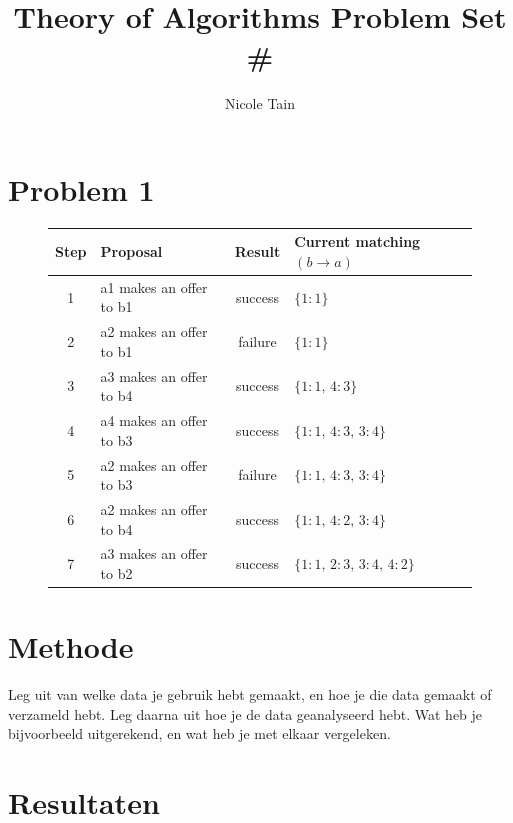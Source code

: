\documentclass[12pt]{article}
\title{Theory of Algorithms Problem Set \#}
\author{Nicole Tain}
\begin{document}
\maketitle                  %
\thispagestyle{empty}       %

\section*{Problem 1}
\begin{figure}[H]
\centering
\begin{tabular}{c l c l}
\toprule
Step & Proposal & Result & Current matching $(b \to a)$ \\
\midrule
1 & a1 makes an offer to b1 & success & $\{1:1\}$ \\
2 & a2 makes an offer to b1 & failure & $\{1:1\}$ \\
3 & a3 makes an offer to b4 & success & $\{1:1,\,4:3\}$ \\
4 & a4 makes an offer to b3 & success & $\{1:1,\,4:3,\,3:4\}$ \\
5 & a2 makes an offer to b3 & failure & $\{1:1,\,4:3,\,3:4\}$ \\
6 & a2 makes an offer to b4 & success & $\{1:1,\,4:2,\,3:4\}$ \\
7 & a3 makes an offer to b2 & success & $\{1:1,\,2:3,\,3:4,\,4:2\}$ \\
\bottomrule
\end{tabular}
\end{figure}



\section*{Methode}

Leg uit van welke data je gebruik hebt gemaakt, en hoe je die data gemaakt of verzameld hebt. Leg daarna uit hoe je de data geanalyseerd hebt. Wat heb je bijvoorbeeld uitgerekend, en wat heb je met elkaar vergeleken.

\section*{Resultaten }
\end{document}
